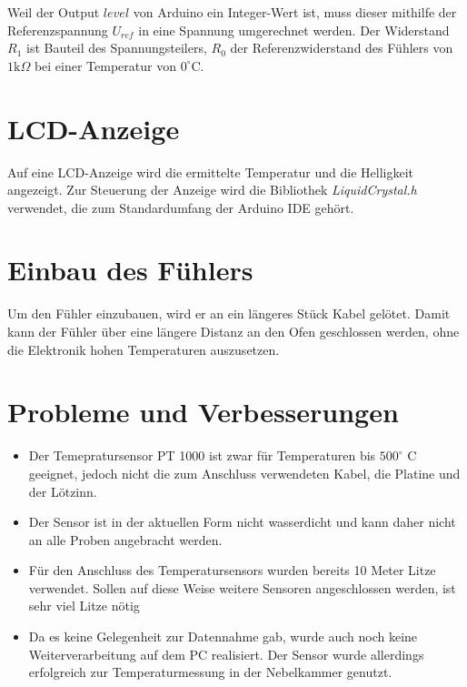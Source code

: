Weil der Output $level$ von Arduino ein Integer-Wert ist, muss dieser mithilfe der Referenzspannung $U_{ref}$ in eine Spannung umgerechnet werden. Der Widerstand $R_1$ ist Bauteil des Spannungsteilers, $R_0$ der Referenzwiderstand des Fühlers von $1 \text{k}\Omega$ bei einer Temperatur von $0^\circ \text{C}$. 

\section{LCD-Anzeige}
Auf eine LCD-Anzeige wird die ermittelte Temperatur und die Helligkeit angezeigt. Zur Steuerung der Anzeige wird die Bibliothek \textit{LiquidCrystal.h} verwendet, die zum Standardumfang der Arduino IDE gehört.

\section{Einbau des Fühlers}
Um den Fühler einzubauen, wird er an ein längeres Stück Kabel gelötet. Damit kann der Fühler über eine längere Distanz an den Ofen geschlossen werden, ohne die Elektronik hohen Temperaturen auszusetzen.


\section{Probleme und Verbesserungen}
\begin{itemize}
	\item Der Temepratursensor PT 1000 ist zwar für Temperaturen bis $500^{\circ}$ C geeignet, jedoch nicht die zum Anschluss verwendeten Kabel, die Platine und der Lötzinn.
	\item Der Sensor ist in der aktuellen Form nicht wasserdicht und kann daher nicht an alle Proben angebracht werden.
	\item Für den Anschluss des Temperatursensors wurden bereits 10 Meter Litze verwendet. Sollen auf diese Weise weitere Sensoren angeschlossen werden, ist sehr viel Litze nötig
	\item Da es keine Gelegenheit zur Datennahme gab, wurde auch noch keine Weiterverarbeitung auf dem PC realisiert. Der Sensor wurde allerdings erfolgreich zur Temperaturmessung in der Nebelkammer genutzt.
\end{itemize}

\clearpage

